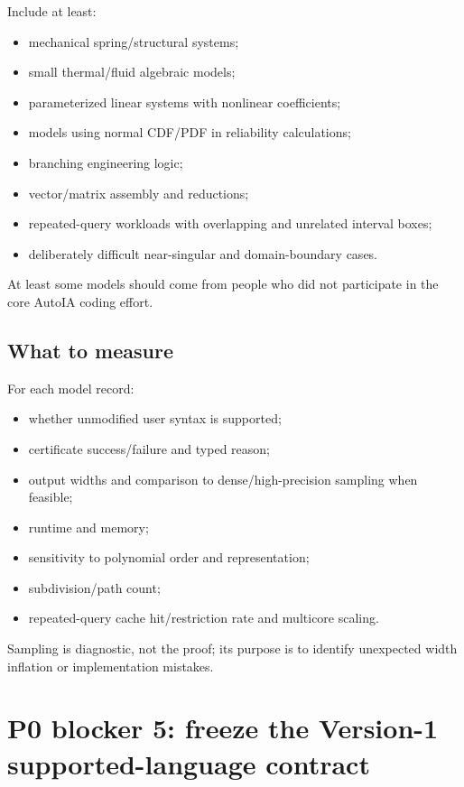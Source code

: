 \documentclass[11pt]{article}
\begin{document}
Include at least:
\begin{itemize}[leftmargin=*]
\item mechanical spring/structural systems;
\item small thermal/fluid algebraic models;
\item parameterized linear systems with nonlinear coefficients;
\item models using normal CDF/PDF in reliability calculations;
\item branching engineering logic;
\item vector/matrix assembly and reductions;
\item repeated-query workloads with overlapping and unrelated interval boxes;
\item deliberately difficult near-singular and domain-boundary cases.
\end{itemize}

At least some models should come from people who did not participate in the core
AutoIA coding effort.

\subsection{What to measure}

For each model record:
\begin{itemize}[leftmargin=*]
\item whether unmodified user syntax is supported;
\item certificate success/failure and typed reason;
\item output widths and comparison to dense/high-precision sampling when feasible;
\item runtime and memory;
\item sensitivity to polynomial order and representation;
\item subdivision/path count;
\item repeated-query cache hit/restriction rate and multicore scaling.
\end{itemize}

Sampling is diagnostic, not the proof; its purpose is to identify unexpected
width inflation or implementation mistakes.

\section{P0 blocker 5: freeze the Version-1 supported-language contract}
\end{document}
